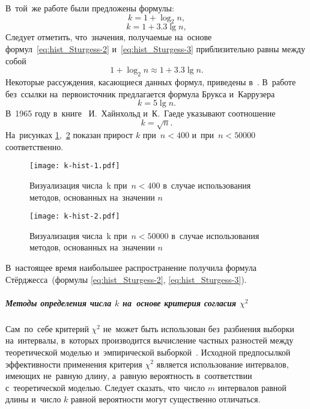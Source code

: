 \documentclass[]{scrartcl}
\begin{document}
В~той~же работе были предложены формулы:
\begin{equation}\label{eq:hist_Sturgess-2}
k = 1 + \log_2 n,
\end{equation}
%
\begin{equation}\label{eq:hist_Sturgess-3}
k = 1 + 3.3\lg n,
\end{equation}
Следует отметить, что~значения, получаемые на~основе формул~\ref{eq:hist_Sturgess-2} и~\ref{eq:hist_Sturgess-3} приблизительно равны между собой
\begin{equation}\label{eq:hist_Sturgess-2+3}
1 + \log_2 n \approx 1 + 3.3\lg n.
\end{equation}
Некоторые рассуждения, касающиеся данных формул, приведены в~\cite{Wand:Data-Based-Hist}.
В~работе~\cite{Shtorm:MathStat} без~ссылки на~первоисточник предлагается формула Брукса и~Каррузера
\begin{equation}\label{eq:hist-Bruks-Karruzer}
k = 5 \lg n.
\end{equation}
В~1965 году в~книге~\cite{Ingenieur-Statistik} И.~Хайнхольд и~К.~Гаеде указывают соотношение
\begin{equation}\label{eq:hist_Heinholds-Gaede}
k = \sqrt{n}.
\end{equation}
На~рисунках \ref{fig:k-hist-n1},~\ref{fig:k-hist-n2} показан прирост $k$ при~$n < 400$ и~при~$ n < 50000$ соответственно.
\begin{figure}[ht]
	\centering %
	\texttt{[image: k-hist-1.pdf]}
	\caption{Визуализация числа~k при~$n < 400$ в~случае использования методов, основанных на~значении $n$}\label{fig:k-hist-n1}
\end{figure}

\begin{figure}[ht]
	\centering %
	\texttt{[image: k-hist-2.pdf]}
	\caption{Визуализация числа~k при~$n < 50000$ в~случае использования методов, основанных на~значении $n$}\label{fig:k-hist-n2}
\end{figure}
В~настоящее время наибольшее распространение получила формула Стёрджесса~(формулы \ref{eq:hist_Sturgess-2}, \ref{eq:hist_Sturgess-3}). 
\subparagraph{Методы определения числа $k$ на~основе критерия согласия $\chi^{2}$}\label{k-hist:chi-methods}
\par
Сам~по~себе критерий $\chi ^ {2}$ не~может быть использован без~разбиения выборки на~интервалы, в~которых производится вычисление частных разностей между теоретической моделью и~эмпирической выборкой~\cite{Nowiczkij:oczenka-pogresh}. Исходной предпосылкой эффективности применения критерия $\chi^{2}$ является использование интервалов, имеющих не~равную длину, а~равную вероятность в~соответствии с~теоретической моделью. Следует сказать, что~число $m$ интервалов равной длины и~число $k$ равной вероятности могут существенно отличаться.
\end{document}
